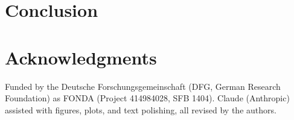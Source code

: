 \documentclass[conference]{IEEEtran}
\begin{document}
\section{Conclusion}
\label{sec:conclusion}


\section*{Acknowledgments}
Funded by the Deutsche Forschungsgemeinschaft (DFG, German Research Foundation) as FONDA (Project 414984028, SFB 1404). Claude (Anthropic) assisted with figures, plots, and text polishing, all revised by the authors.



\end{document}
